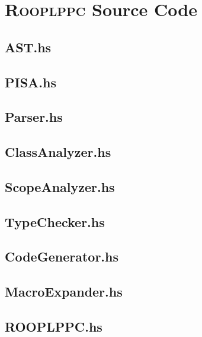 \newcommand{\source}[1]{
    
}

\chapter{\textsc{Rooplppc} Source Code}
\label{app:rooplc-source}

\section*{AST.hs}

\newpage
\section*{PISA.hs}
 
\newpage
\section*{Parser.hs}

\newpage
\section*{ClassAnalyzer.hs}

\newpage
\section*{ScopeAnalyzer.hs}

\newpage
\section*{TypeChecker.hs}

\newpage
\section*{CodeGenerator.hs}

\newpage
\section*{MacroExpander.hs}

\newpage
\section*{ROOPLPPC.hs} 
